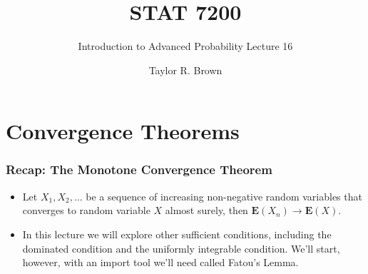 \documentclass[handout]{beamer}
\title{STAT 7200}
\subtitle{Introduction to Advanced Probability \newline Lecture 16}
\author{Taylor R. Brown}
\institute{}
\date{}
\newcommand{\BE}{\mathbf{E}}
\begin{document}
\frame{\titlepage}


\section[Outline]{}
\frame{\tableofcontents}


\section{Convergence Theorems}



\frame
{
  \frametitle{Recap: The Monotone Convergence Theorem } 

   \begin{itemize}
   
   \item<1->[] \begin{Theorem} Let $X_1, X_2, \ldots $ be a sequence of increasing non-negative random variables that converges to random variable $X$ almost surely, then $\BE(X_n)\rightarrow \BE(X)$.   \end{Theorem}


\item<2-> In this lecture we will explore other sufficient conditions, including the dominated condition and the uniformly integrable condition. We'll start, however, with an import tool we'll need called Fatou's Lemma.
                                
\end{itemize}
}
\end{document}
